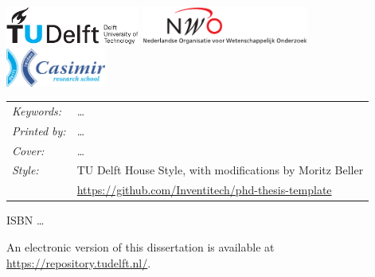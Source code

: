 \begin{titlepage}
\medskip
\vfill
\begin{center}
    \includegraphics[height=0.5in]{figures/logos/tudelft}
    \hspace{2em}
    \includegraphics[height=0.5in]{figures/logos/nwo}
    \\ \vspace{0.5cm}
    \includegraphics[height=0.5in]{figures/logos/casimir}
\end{center}
\vfill

\noindent
\begin{tabular}{@{}p{}@{}p{}}
    \textit{Keywords:} & \ldots \\[\medskipamount]
    \textit{Printed by:} & \ldots \\[\medskipamount]
    \textit{Cover:} & \ldots \\[\medskipamount]
    \textit{Style:} & TU Delft House Style, with modifications by Moritz Beller \\
    & \url{https://github.com/Inventitech/phd-thesis-template} \\[\medskipamount]
\end{tabular}

\vspace{\bigskipamount}



\noindent
ISBN \ldots

\medskip
\noindent An electronic version of this dissertation is available at \\
\url{https://repository.tudelft.nl/}.

\end{titlepage}
